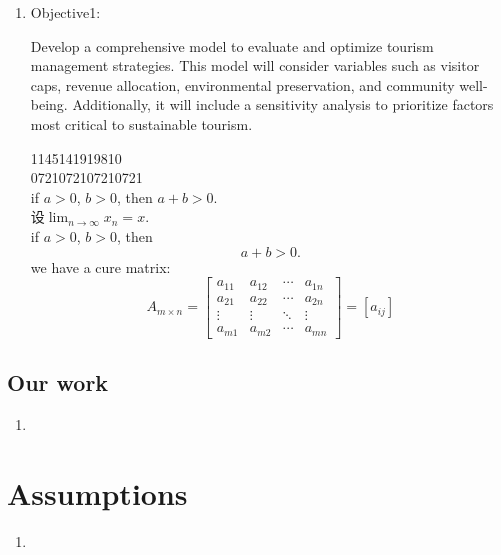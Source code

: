 \documentclass[UTF8]{mcmthesis}
\begin{document}
            \begin{enumerate}
                \item  Objective1: 
                
                Develop a comprehensive model to evaluate and optimize tourism management strategies. This model will consider variables such as visitor caps, revenue allocation, environmental preservation, and community well-being. Additionally, it will include a sensitivity analysis to prioritize factors most critical to sustainable tourism.

                1145141919810\\
                0721072107210721\\
                if $a>0$, $b>0$, then $a+b>0$.\\
                设$\displaystyle\lim_{n\to\infty}x_n=x$.\\

                
                if $a>0$, $b>0$, then 
                    \[
                    a+b>0.
                    \]
                we have a cure matrix:
                    \[
                        A_{m\times n}=  
                        \begin{bmatrix}  
                          a_{11}& a_{12}& \cdots  & a_{1n} \\  
                          a_{21}& a_{22}& \cdots  & a_{2n} \\  
                          \vdots & \vdots & \ddots & \vdots \\  
                          a_{m1}& a_{m2}& \cdots  & a_{mn}  
                        \end{bmatrix}  
                        =\left [ a_{ij}\right ] 
                    \]
            \end{enumerate}
        \subsection{Our work}
            \begin{enumerate}
                \item 
            \end{enumerate}
            

    \section{Assumptions}
        \begin{enumerate}
            \item 
        \end{enumerate}
        
\end{document}
